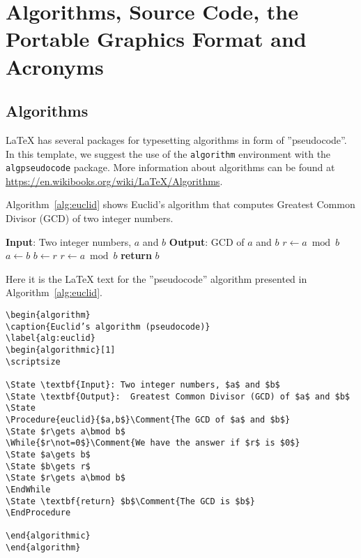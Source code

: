 
\chapter{Algorithms, Source Code, the \\Portable Graphics Format and Acronyms} %
\label{chap:Chapter3} %

\section{Algorithms}

 \LaTeX{}  has several packages for typesetting algorithms in form of ''pseudocode''. In this template, we suggest the use of the \verb|algorithm| environment with the \verb|algpseudocode| package. 
More information about algorithms can be found at \url{https://en.wikibooks.org/wiki/LaTeX/Algorithms}.

Algorithm~\ref{alg:euclid} shows Euclid's algorithm that computes  Greatest Common Divisor (GCD) of two integer numbers.

\begin{algorithm}[b]
\caption{Euclid’s algorithm}
\label{alg:euclid}
\begin{algorithmic}[1]
\scriptsize

\State \textbf{Input}: Two integer numbers, $a$ and $b$
\State \textbf{Output}: GCD of $a$ and $b$
\State
{}
\State $r\gets a\bmod b$
\State $a\gets b$
\State $b\gets r$
\State $r\gets a\bmod b$
\EndWhile
\State \textbf{return} $b$
\EndProcedure

\end{algorithmic}
\end{algorithm}

Here it is the \LaTeX{} text for the ''pseudocode'' algorithm presented in  Algorithm~\ref{alg:euclid}.

\begin{verbatim}
\begin{algorithm}
\caption{Euclid’s algorithm (pseudocode)}
\label{alg:euclid}
\begin{algorithmic}[1]
\scriptsize

\State \textbf{Input}: Two integer numbers, $a$ and $b$
\State \textbf{Output}:  Greatest Common Divisor (GCD) of $a$ and $b$
\State
\Procedure{euclid}{$a,b$}\Comment{The GCD of $a$ and $b$}
\State $r\gets a\bmod b$
\While{$r\not=0$}\Comment{We have the answer if $r$ is $0$}
\State $a\gets b$
\State $b\gets r$
\State $r\gets a\bmod b$
\EndWhile
\State \textbf{return} $b$\Comment{The GCD is $b$}
\EndProcedure

\end{algorithmic}
\end{algorithm}
\end{verbatim}

